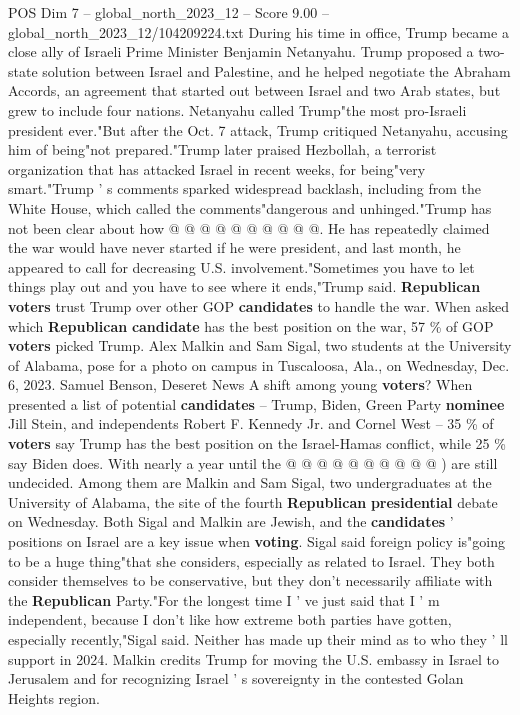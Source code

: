 \begin{textsample}{POS Dim 7 – global\_north\_2023\_12 – Score 9.00 – global\_north\_2023\_12/104209224.txt}
During his time in office, Trump became a close ally of Israeli Prime Minister Benjamin Netanyahu.
Trump proposed a two-state solution between Israel and Palestine, and he helped negotiate the Abraham Accords, an agreement that started out between Israel and two Arab states, but grew to include four nations.
Netanyahu called Trump"the most pro-Israeli president ever."But after the Oct. 7 attack, Trump critiqued Netanyahu, accusing him of being"not prepared."Trump later praised Hezbollah, a terrorist organization that has attacked Israel in recent weeks, for being"very smart."Trump ' s comments sparked widespread backlash, including from the White House, which called the comments"dangerous and unhinged."Trump has not been clear about how @ @ @ @ @ @ @ @ @ @.
He has repeatedly claimed the war would have never started if he were president, and last month, he appeared to call for decreasing U.S. involvement."Sometimes you have to let things play out and you have to see where it ends,"Trump said. \textbf{Republican} \textbf{voters} trust Trump over other GOP \textbf{candidates} to handle the war.
When asked which \textbf{Republican} \textbf{candidate} has the best position on the war, 57 \% of GOP \textbf{voters} picked Trump.
Alex Malkin and Sam Sigal, two students at the University of Alabama, pose for a photo on campus in Tuscaloosa, Ala., on Wednesday, Dec. 6, 2023.
Samuel Benson, Deseret News A shift among young \textbf{voters}?
When presented a list of potential \textbf{candidates} -- Trump, Biden, Green Party \textbf{nominee} Jill Stein, and independents Robert F.
Kennedy Jr. and Cornel West -- 35 \% of \textbf{voters} say Trump has the best position on the Israel-Hamas conflict, while 25 \% say Biden does.
With nearly a year until the @ @ @ @ @ @ @ @ @ @ ) are still undecided.
Among them are Malkin and Sam Sigal, two undergraduates at the University of Alabama, the site of the fourth \textbf{Republican} \textbf{presidential} debate on Wednesday.
Both Sigal and Malkin are Jewish, and the \textbf{candidates} ' positions on Israel are a key issue when \textbf{voting}.
Sigal said foreign policy is"going to be a huge thing"that she considers, especially as related to Israel.
They both consider themselves to be conservative, but they don't necessarily affiliate with the \textbf{Republican} Party."For the longest time I ' ve just said that I ' m independent, because I don't like how extreme both parties have gotten, especially recently,"Sigal said.
Neither has made up their mind as to who they ' ll support in 2024.
Malkin credits Trump for moving the U.S. embassy in Israel to Jerusalem and for recognizing Israel ' s sovereignty in the contested Golan Heights region.

\end{textsample}
